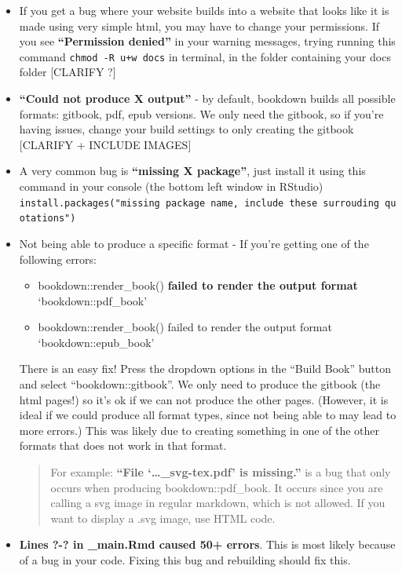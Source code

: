 \documentclass[
]{book}
\providecommand{\tightlist}{%
  \setlength{\itemsep}{0pt}\setlength{\parskip}{0pt}}
\theoremstyle{definition}
\theoremstyle{definition}
\theoremstyle{definition}
\theoremstyle{definition}
\theoremstyle{remark}
\begin{document}
\begin{itemize}
\item
  If you get a bug where your website builds into a website that looks like it is made using very simple html, you may have to change your permissions. If you see \textbf{``Permission denied''} in your warning messages, trying running this command \texttt{chmod\ -R\ u+w\ docs} in terminal, in the folder containing your docs folder {[}CLARIFY ?{]}
\item
  \textbf{``Could not produce X output''} - by default, bookdown builds all possible formats: gitbook, pdf, epub versions. We only need the gitbook, so if you're having issues, change your build settings to only creating the gitbook {[}CLARIFY + INCLUDE IMAGES{]}
\item
  A very common bug is \textbf{``missing X package''}, just install it using this command in your console (the bottom left window in RStudio) \texttt{install.packages("missing\ package\ name,\ include\ these\ surrouding\ quotations")}
\item
  Not being able to produce a specific format - If you're getting one of the following errors:

  \begin{itemize}
  \tightlist
  \item
    bookdown::render\_book() \textbf{failed to render the output format} `bookdown::pdf\_book'
  \item
    bookdown::render\_book() failed to render the output format `bookdown::epub\_book'
  \end{itemize}

  There is an easy fix! Press the dropdown options in the ``Build Book'' button and select ``bookdown::gitbook''. We only need to produce the gitbook (the html pages!) so it's ok if we can not produce the other pages. (However, it is ideal if we could produce all format types, since not being able to may lead to more errors.) This was likely due to creating something in one of the other formats that does not work in that format.

  \begin{quote}
  For example: \textbf{``File `\ldots\_svg-tex.pdf' is missing.''} is a bug that only occurs when producing bookdown::pdf\_book. It occurs since you are calling a svg image in regular markdown, which is not allowed. If you want to display a .svg image, use HTML code.
  \end{quote}
\item
  \textbf{Lines ?-? in \_main.Rmd caused 50+ errors}. This is most likely because of a bug in your code. Fixing this bug and rebuilding should fix this.


\end{itemize}
\end{document}

